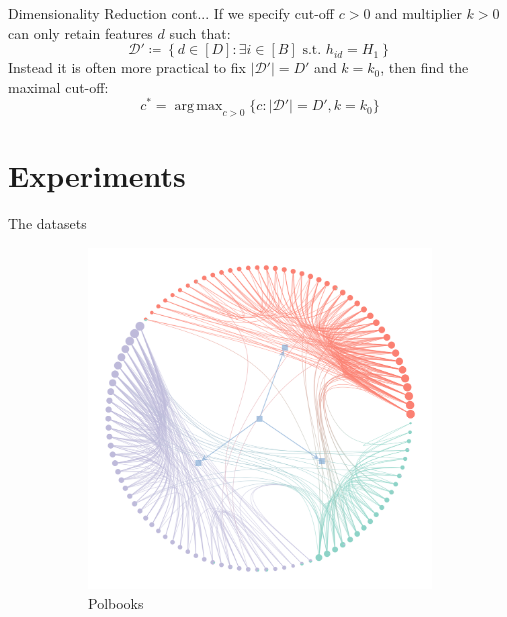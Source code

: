 \documentclass{beamer}
\newcommand{\Dcal}{\mathcal{D}}
\DeclareMathOperator*{\argmax}{arg\,max} %
\begin{document}
	\begin{frame}{Dimensionality Reduction cont...}
		If we specify cut-off $c>0$ and multiplier $k>0$ can only retain features $d$ such that:
		$$\Dcal' \coloneqq \left\{ d \in [D] : \exists i \in [B] \textrm{ s.t. } h_{id} = H_1\right\}$$
		Instead it is often more practical to fix $|\Dcal'| = D'$ and $k=k_0$, then find the maximal cut-off:
		$$c^* = \argmax_{c>0}\{c: |\Dcal'|=D', k=k_0\}$$
	\end{frame}

\section{Experiments}

	\begin{frame}{The datasets}
		\begin{figure}[!h]
			\centering
			\begin{subfigure}[t]{0.3\linewidth}
				\centering
				\includegraphics[width=\linewidth]{polbooks-graph.png}
				\caption{Polbooks}
				\label{fig:polbooks-graph}
			\end{subfigure}
			\hfill
			\begin{subfigure}[t]{0.3\linewidth}
				\centering

\end{subfigure}
\end{figure}
\end{frame}
\end{document}
